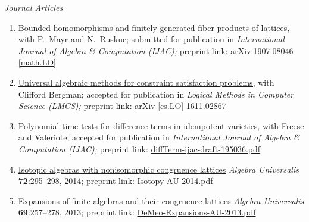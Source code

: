 \newcommand\mmskip{-6mm}

\newcommand\pubitem[6]{\item \href{#5}{#1} #2 \textit{#3} #4 preprint link: \href{#5}{#6}}

    {\it Journal Articles}\\[-6pt]
    \begin{enumerate}
      \pubitem
      {Bounded homomorphisms and finitely generated fiber products of lattices,}
      {with P.~Mayr and N.~Ruskuc; submitted for publication in}
      {International Journal of Algebra \& Computation {\small (IJAC)};}
      {}
      {https://arxiv.org/abs/1907.08046}
      {arXiv:1907.08046 [math.LO]}

      \pubitem
      {Universal algebraic methods for constraint satisfaction problems,}
      {with Clifford Bergman; accepted for publication in}
      {Logical Methods in Computer Science {\small (LMCS)};}
      {}
      {https://arxiv.org/abs/1611.02867}
      {arXiv [cs.LO] 1611.02867}
        
      \pubitem
      {Polynomial-time tests for difference terms in idempotent varieties,}
      {with Freese and Valeriote; accepted for publication in}
      {International Journal of Algebra \& Computation {\small (IJAC)};}
      {}
      {https://github.com/UniversalAlgebra/term-conditions/blob/master/DiffTerm/diffTerm-ijac-draft-195036.pdf}
      {diffTerm-ijac-draft-195036.pdf}
      
      \pubitem 
      {Isotopic algebras with nonisomorphic congruence lattices}
      {}  %
      {Algebra Universalis}
      {\textbf{72}:295--298, 2014;} 
      {https://github.com/williamdemeo/Isotopy/blob/master/Isotopy-AU-2014.pdf}
      {Isotopy-AU-2014.pdf}
      
      \pubitem 
      {Expansions of finite algebras and their congruence lattices}
      {}
      {Algebra Universalis}
      {\textbf{69}:257--278, 2013;}
      {https://github.com/williamdemeo/Overalgebras/blob/master/DeMeo-Expansions-AU-2013.pdf}
      {DeMeo-Expansions-AU-2013.pdf}

\end{enumerate}


